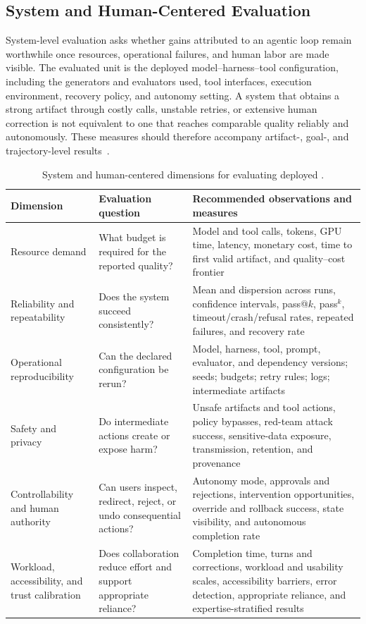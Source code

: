 \subsection{System and Human-Centered Evaluation}
\label{subsec:system-human-eval}

System-level evaluation asks whether gains attributed to an agentic loop remain worthwhile once resources, operational failures, and human labor are made visible. The evaluated unit is the deployed model--harness--tool configuration, including the generators and evaluators used, tool interfaces, execution environment, recovery policy, and autonomy setting. A system that obtains a strong artifact through costly calls, unstable retries, or extensive human correction is not equivalent to one that reaches comparable quality reliably and autonomously. These measures should therefore accompany artifact-, goal-, and trajectory-level results~\cite{avg250915160,avg260605525,avg260526144,avg260608091}.

\begin{table}[t]
  \caption{System and human-centered dimensions for evaluating deployed \AVG{}.}
  \label{tab:system-human-evaluation}
  \small
  \begin{tabularx}{\textwidth}{@{}p{}XX@{}}
    \toprule
    Dimension & Evaluation question & Recommended observations and measures \\
    \midrule
    Resource demand & What budget is required for the reported quality? & Model and tool calls, tokens, GPU time, latency, monetary cost, time to first valid artifact, and quality--cost frontier \\
    Reliability and repeatability & Does the system succeed consistently? & Mean and dispersion across runs, confidence intervals, pass@$k$, pass$^k$, timeout/crash/refusal rates, repeated failures, and recovery rate \\
    Operational reproducibility & Can the declared configuration be rerun? & Model, harness, tool, prompt, evaluator, and dependency versions; seeds; budgets; retry rules; logs; intermediate artifacts \\
    Safety and privacy & Do intermediate actions create or expose harm? & Unsafe artifacts and tool actions, policy bypasses, red-team attack success, sensitive-data exposure, transmission, retention, and provenance \\
    Controllability and human authority & Can users inspect, redirect, reject, or undo consequential actions? & Autonomy mode, approvals and rejections, intervention opportunities, override and rollback success, state visibility, and autonomous completion rate \\
    Workload, accessibility, and trust calibration & Does collaboration reduce effort and support appropriate reliance? & Completion time, turns and corrections, workload and usability scales, accessibility barriers, error detection, appropriate reliance, and expertise-stratified results \\
    \bottomrule
  \end{tabularx}
\end{table}
\FloatBarrier

